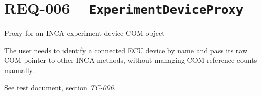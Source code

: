 \section{REQ-006 -- \texttt{ExperimentDeviceProxy}}
\label{sec:experimentdeviceproxy}

 Proxy for an INCA experiment device COM object \statusupd

\medskip
{}
The user needs to identify a connected ECU device by name and pass its raw COM pointer to
other INCA methods, without managing COM reference counts manually.

\medskip
{}

\medskip
{}
See test document, section \textit{TC-006}.